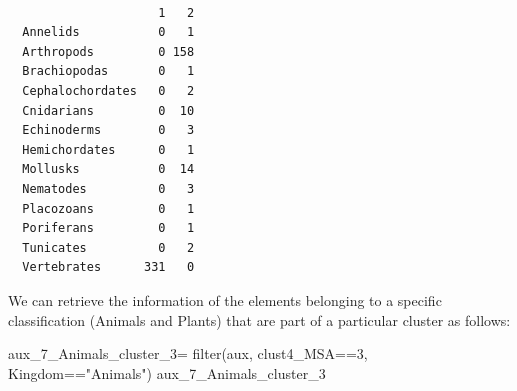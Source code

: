 \documentclass[
  letterpaper,
  DIV=11,
  numbers=noendperiod]{scrreprt}
\newenvironment{Shaded}{}{}
\newcommand{\DecValTok}[1]{\textcolor[rgb]{0.82,0.60,0.40}{#1}}
\newcommand{\FunctionTok}[1]{\textcolor[rgb]{0.38,0.69,0.94}{#1}}
\newcommand{\NormalTok}[1]{\textcolor[rgb]{0.67,0.70,0.75}{#1}}
\newcommand{\OtherTok}[1]{\textcolor[rgb]{0.15,0.68,0.38}{#1}}
\newcommand{\SpecialCharTok}[1]{\textcolor[rgb]{0.34,0.71,0.76}{#1}}
\newcommand{\StringTok}[1]{\textcolor[rgb]{0.60,0.76,0.47}{#1}}
\begin{document}
\begin{Shaded}
\end{Shaded}

\begin{verbatim}
                  
                     1   2
  Annelids           0   1
  Arthropods         0 158
  Brachiopodas       0   1
  Cephalochordates   0   2
  Cnidarians         0  10
  Echinoderms        0   3
  Hemichordates      0   1
  Mollusks           0  14
  Nematodes          0   3
  Placozoans         0   1
  Poriferans         0   1
  Tunicates          0   2
  Vertebrates      331   0
\end{verbatim}

We can retrieve the information of the elements belonging to a specific
classification (Animals and Plants) that are part of a particular
cluster as follows:

\begin{Shaded}
\begin{Highlighting}[]
\NormalTok{aux\_7\_Animals\_cluster\_3}\OtherTok{=} \FunctionTok{filter}\NormalTok{(aux,}
\NormalTok{                                clust4\_MSA}\SpecialCharTok{==}\DecValTok{3}\NormalTok{,}
\NormalTok{                                Kingdom}\SpecialCharTok{==}\StringTok{"Animals"}\NormalTok{)}
\NormalTok{aux\_7\_Animals\_cluster\_3}
\end{Highlighting}
\end{Shaded}
\end{document}
